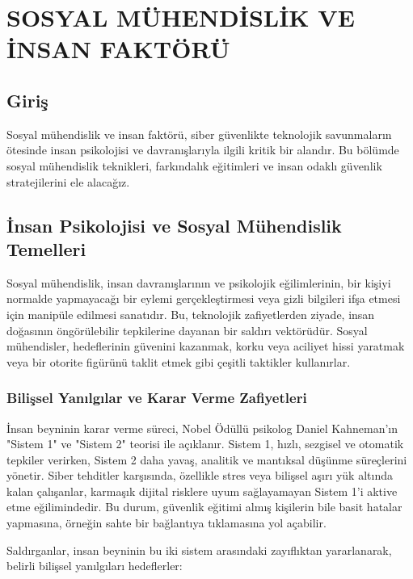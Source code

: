 \chapter{SOSYAL MÜHENDİSLİK VE İNSAN FAKTÖRÜ}

\section*{Giriş}
Sosyal mühendislik ve insan faktörü, siber güvenlikte teknolojik savunmaların ötesinde insan psikolojisi ve davranışlarıyla ilgili kritik bir alandır. Bu bölümde sosyal mühendislik teknikleri, farkındalık eğitimleri ve insan odaklı güvenlik stratejilerini ele alacağız.

\section{İnsan Psikolojisi ve Sosyal Mühendislik Temelleri}

Sosyal mühendislik, insan davranışlarının ve psikolojik eğilimlerinin, bir kişiyi normalde yapmayacağı bir eylemi gerçekleştirmesi veya gizli bilgileri ifşa etmesi için manipüle edilmesi sanatıdır. Bu, teknolojik zafiyetlerden ziyade, insan doğasının öngörülebilir tepkilerine dayanan bir saldırı vektörüdür. Sosyal mühendisler, hedeflerinin güvenini kazanmak, korku veya aciliyet hissi yaratmak veya bir otorite figürünü taklit etmek gibi çeşitli taktikler kullanırlar.

\subsection{Bilişsel Yanılgılar ve Karar Verme Zafiyetleri}

İnsan beyninin karar verme süreci, Nobel Ödüllü psikolog Daniel Kahneman'ın "Sistem 1" ve "Sistem 2" teorisi ile açıklanır. Sistem 1, hızlı, sezgisel ve otomatik tepkiler verirken, Sistem 2 daha yavaş, analitik ve mantıksal düşünme süreçlerini yönetir. Siber tehditler karşısında, özellikle stres veya bilişsel aşırı yük altında kalan çalışanlar, karmaşık dijital risklere uyum sağlayamayan Sistem 1'i aktive etme eğilimindedir. Bu durum, güvenlik eğitimi almış kişilerin bile basit hatalar yapmasına, örneğin sahte bir bağlantıya tıklamasına yol açabilir.

Saldırganlar, insan beyninin bu iki sistem arasındaki zayıflıktan yararlanarak, belirli bilişsel yanılgıları hedeflerler:

